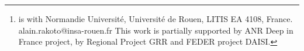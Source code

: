 \documentclass{article}
\begin{document}


\title{}

\author{
 \thanks{
 \newline  is with Normandie Universit\'e, Universit\'e de Rouen,  LITIS EA 4108,  France. alain.rakoto@insa-rouen.fr
\newline This work is partially supported by ANR Deep in France project, by Regional Project GRR and FEDER project DAISI.
}
}


\maketitle

\end{document}
